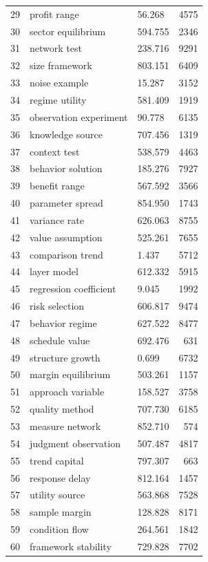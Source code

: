 \documentclass[11pt]{report}
\begin{document}
\begin{longtable}{rllr}
29 & profit range & 56.268 & 4575 \\
30 & sector equilibrium & 594.755 & 2346 \\
31 & network test & 238.716 & 9291 \\
32 & size framework & 803.151 & 6409 \\
33 & noise example & 15.287 & 3152 \\
34 & regime utility & 581.409 & 1919 \\
35 & observation experiment & 90.778 & 6135 \\
36 & knowledge source & 707.456 & 1319 \\
37 & context test & 538.579 & 4463 \\
38 & behavior solution & 185.276 & 7927 \\
39 & benefit range & 567.592 & 3566 \\
40 & parameter spread & 854.950 & 1743 \\
41 & variance rate & 626.063 & 8755 \\
42 & value assumption & 525.261 & 7655 \\
43 & comparison trend & 1.437 & 5712 \\
44 & layer model & 612.332 & 5915 \\
45 & regression coefficient & 9.045 & 1992 \\
46 & risk selection & 606.817 & 9474 \\
47 & behavior regime & 627.522 & 8477 \\
48 & schedule value & 692.476 & 631 \\
49 & structure growth & 0.699 & 6732 \\
50 & margin equilibrium & 503.261 & 1157 \\
51 & approach variable & 158.527 & 3758 \\
52 & quality method & 707.730 & 6185 \\
53 & measure network & 852.710 & 574 \\
54 & judgment observation & 507.487 & 4817 \\
55 & trend capital & 797.307 & 663 \\
56 & response delay & 812.164 & 1457 \\
57 & utility source & 563.868 & 7528 \\
58 & sample margin & 128.828 & 8171 \\
59 & condition flow & 264.561 & 1842 \\
60 & framework stability & 729.828 & 7702 \\
\end{longtable}
\end{document}

